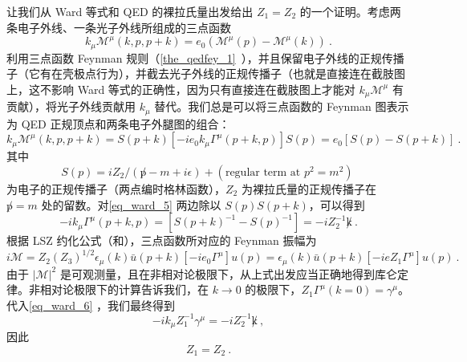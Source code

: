让我们从 Ward 等式和 QED 的裸拉氏量出发给出 $Z_1=Z_2$ 的一个证明。考虑两条电子外线、一条光子外线所组成的三点函数
\begin{equation}
k_\mu \mathcal{M}^\mu(k,p,p+k)=e_0(\mathcal{M}^{\mu}(p)- \mathcal{M}^{\mu}(k))~.
\end{equation}
利用三点函数 Feynman 规则（\autoref{the_qedfey_1}~），并且保留电子外线的正规传播子（它有在壳极点行为），并截去光子外线的正规传播子（也就是直接连在截肢图上，这不影响 Ward 等式的正确性，因为只有直接连在截肢图上才能对 $k_\mu \mathcal{M}^\mu$ 有贡献），将光子外线贡献用 $k_\mu$ 替代。我们总是可以将三点函数的 Feynman 图表示为 QED 正规顶点和两条电子外腿图的组合：
\begin{equation}\label{eq_ward_5}
k_\mu \mathcal{M}^\mu(k,p,p+k) = S(p+k) [-ie_0k_\mu \Gamma^\mu(p+k,p)] S(p) =e_0[S(p)-S(p+k)]~.
\end{equation}
其中
\begin{equation}
S(p)=iZ_2/(\not p-m+i\epsilon)+(\text{regular term at } p^2=m^2)~
\end{equation}
为电子的正规传播子（两点编时格林函数），$Z_2$ 为裸拉氏量的正规传播子在 $\not p=m$ 处的留数。对\autoref{eq_ward_5} 两边除以 $S(p)S(p+k)$，可以得到
\begin{equation}\label{eq_ward_6}
-ik_\mu \Gamma^\mu(p+k,p) = [S(p+k)^{-1}-S(p)^{-1}]= -i Z_2^{-1}\not k~.
\end{equation}
根据 LSZ 约化公式（和），三点函数所对应的 Feynman 振幅为
\begin{equation}
i\mathcal{M} = Z_2(Z_3)^{1/2}\epsilon_\mu(k)\bar u(p+k)[-ie_0\Gamma^\mu] u(p)=\epsilon_\mu(k)\bar u(p+k)[-i e Z_1\Gamma^\mu] u(p)~.
\end{equation}
由于 $|\mathcal{M}|^2$ 是可观测量，且在非相对论极限下，从上式出发应当正确地得到库仑定律。非相对论极限下的计算告诉我们，在 $k\rightarrow 0$ 的极限下，$Z_1 \Gamma^\mu(k=0) = \gamma^\mu$。代入\autoref{eq_ward_6} ，我们最终得到
\begin{equation}
-i k_\mu Z_1^{-1} \gamma^\mu = -i Z_2^{-1}\not k~,
\end{equation}
因此
\begin{equation}
Z_1=Z_2~.
\end{equation}

